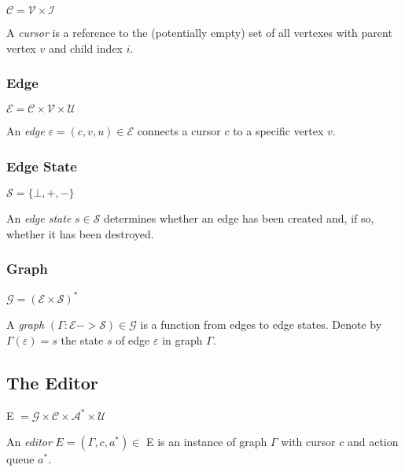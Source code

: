 \documentclass[letterpaper,12pt]{article}
\def\A{\mathcal{A}}
\def\C{\mathcal{C}}
\def\E{\mathcal{E}}
\def\G{\mathcal{G}}
\def\I{\mathcal{I}}
\def\S{\mathcal{S}}
\def\U{\mathcal{U}}
\def\V{\mathcal{V}}
\def\e{\varepsilon}
\begin{document}
$\C = \V \times \I$

A \emph{cursor} is a reference to the (potentially empty) set of all vertexes
with parent vertex $v$ and child index $i$.


\subsubsection{Edge}
\label{sec:edge}

$\E = \C \times \V \times \U$

An \emph{edge} $\e = (c, v, u) \in \E$ connects a cursor $c$ to a specific
vertex $v$.


\subsubsection{Edge State}
\label{sec:edge-state}

$\S = \{\bot,+,-\}$

An \emph{edge state} $s \in \S$ determines whether an edge has been created
and, if so, whether it has been destroyed.


\subsubsection{Graph}
\label{sec:graph}

$\G = (\E \times \S)^{*}$

A \emph{graph} $(\Gamma : \E -> \S) \in \G$ is a function from edges to edge
states. Denote by $\Gamma(\e) = s$ the state $s$ of edge $\e$ in graph
$\Gamma$.


\subsection{The Editor}
\label{sec:the-editor}

E $= \G \times \C \times \A^{*} \times \U$

An \emph{editor} $E = (\Gamma,c,a^{*}) \in$ E is an instance of graph $\Gamma$
with cursor $c$ and action queue $a^{*}$.
\end{document}

